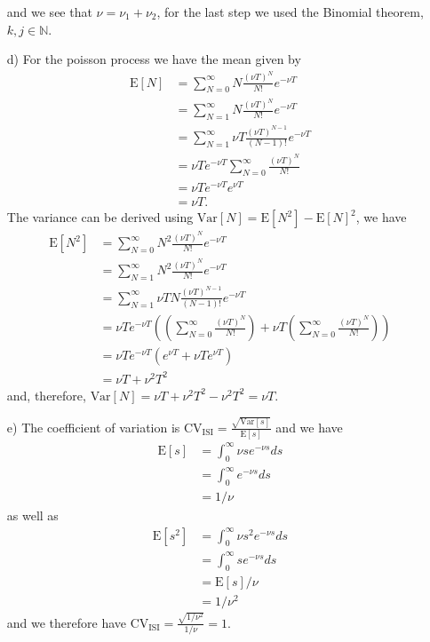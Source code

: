 \documentclass{scrartcl}
\begin{document}
\begin{itemize}
        and we see that $\nu = \nu_1+\nu_2$, for the last step we used the Binomial theorem, $k,j\in\mathds N$.
        \item[d)] For the poisson process we have the mean given by
        \begin{align*}
            \text{E}[N] &= \sum_{N=0}^\infty N\frac{(\nu T)^N}{N!}e^{-\nu T} \\
            &= \sum_{N=1}^\infty N\frac{(\nu T)^N}{N!}e^{-\nu T} \\
            &= \sum_{N=1}^\infty \nu T\frac{(\nu T)^{N-1}}{(N-1)!}e^{-\nu T} \\
            &= \nu Te^{-\nu T} \sum_{N=0}^\infty \frac{(\nu T)^{N}}{N!} \\
            &= \nu Te^{-\nu T}e^{\nu T} \\
            &= \nu T.
        \end{align*}
        The variance can be derived using $\text{Var}[N] = \text{E}[N^2] - \text{E}[N]^2$, we have
        \begin{align*}
            \text{E}[N^2] &= \sum_{N=0}^\infty N^2\frac{(\nu T)^N}{N!}e^{-\nu T} \\
            &= \sum_{N=1}^\infty N^2\frac{(\nu T)^N}{N!}e^{-\nu T} \\
            &= \sum_{N=1}^\infty \nu TN\frac{(\nu T)^{N-1}}{(N-1)!}e^{-\nu T} \\
            &= \nu Te^{-\nu T} \left(\left(\sum_{N=0}^\infty \frac{(\nu T)^{N}}{N!}\right)+\nu T\left(\sum_{N=0}^\infty \frac{(\nu T)^{N}}{N!}\right)\right) \\
            &= \nu Te^{-\nu T}\left(e^{\nu T}+\nu Te^{\nu T}\right) \\
            &= \nu T + \nu^2T^2
        \end{align*}
        and, therefore, $\text{Var}[N] = \nu T + \nu^2T^2 - \nu^2T^2 = \nu T$.
        \item[e)] The coefficient of variation is $\text{CV}_\text{ISI} = \frac{\sqrt{\text{Var}[s]}}{\text{E}[s]} $ and we have
        \begin{align*}
            \text{E}[s] &= \int_{0}^\infty \nu se^{-\nu s}ds \\
            &= \int_0^\infty e^{-\nu s} ds \\
            &= 1/\nu
        \end{align*}
        as well as
        \begin{align*}
            \text{E}[s^2] &= \int_{0}^\infty \nu s^2e^{-\nu s}ds \\
            &= \int_0^\infty se^{-\nu s} ds \\
            &= \text{E}[s]/\nu \\
            &= 1/\nu^2
        \end{align*}
        and we therefore have $\text{CV}_\text{ISI} = \frac{\sqrt{1/\nu^2}}{1/\nu} = 1$.
    \end{itemize}
    
\end{document}
